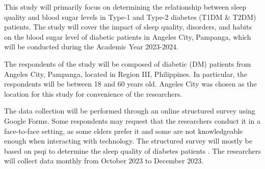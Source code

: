 
This study will primarily focus on determining the relationship between sleep
quality and blood sugar levels in Type-1 and Type-2 diabetes (T1DM \& T2DM)
patients. The study will cover the impact of sleep quality, disorders, and
habits on the blood sugar level of diabetic patients in Angeles City, Pampanga,
which will be conducted during the Academic Year 2023-2024.

The respondents of the study will be composed of diabetic (DM) patients from
Angeles City, Pampanga, located in Region III, Philippines. In particular, the
respondents will be between 18 and 60 years old. Angeles City was chosen as the
location for this study for convenience of the researchers.

The data collection will be performed through an online structured survey using
Google Forms. Some respondents may request that the researchers conduct it in a
face-to-face setting, as some elders prefer it and some are not knowledgeable
enough when interacting with technology. The structured survey will mostly be
based on \ac{psqi} to determine the sleep quality of diabetes patients
\parencite{xu-2019}. The researchers will collect data monthly from October 2023
to December 2023.

